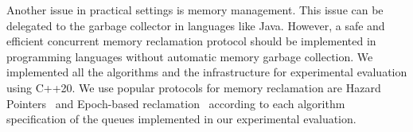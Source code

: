 Another issue in practical settings is memory management. This issue can be delegated to the garbage collector in languages like Java. However, a safe and efficient concurrent memory reclamation protocol should be implemented in programming languages without automatic memory garbage collection. We implemented all the algorithms and the infrastructure for experimental evaluation using C++20. We use popular protocols for memory reclamation are Hazard Pointers~\cite{DBLP_conf_podc_Michael02} and Epoch-based reclamation~\cite{DBLP_phd_ethos_Fraser04,mckenney2001read} according to each algorithm specification of the queues implemented in our experimental evaluation.

